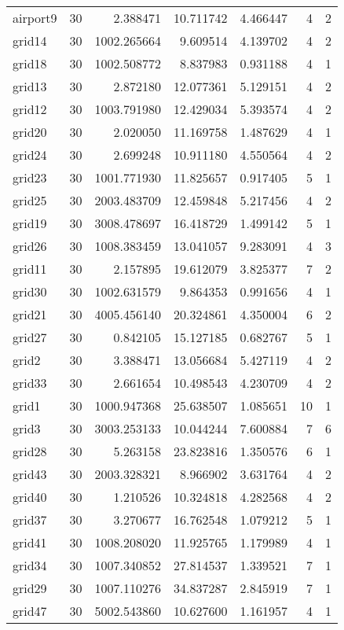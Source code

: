 \begin{longtable}{|l|r|r|r|r|r|r|}
airport9 & 30 & 2.388471 & 10.711742 & 4.466447 & 4 & 2 \\
grid14 & 30 & 1002.265664 & 9.609514 & 4.139702 & 4 & 2 \\
grid18 & 30 & 1002.508772 & 8.837983 & 0.931188 & 4 & 1 \\
grid13 & 30 & 2.872180 & 12.077361 & 5.129151 & 4 & 2 \\
grid12 & 30 & 1003.791980 & 12.429034 & 5.393574 & 4 & 2 \\
grid20 & 30 & 2.020050 & 11.169758 & 1.487629 & 4 & 1 \\
grid24 & 30 & 2.699248 & 10.911180 & 4.550564 & 4 & 2 \\
grid23 & 30 & 1001.771930 & 11.825657 & 0.917405 & 5 & 1 \\
grid25 & 30 & 2003.483709 & 12.459848 & 5.217456 & 4 & 2 \\
grid19 & 30 & 3008.478697 & 16.418729 & 1.499142 & 5 & 1 \\
grid26 & 30 & 1008.383459 & 13.041057 & 9.283091 & 4 & 3 \\
grid11 & 30 & 2.157895 & 19.612079 & 3.825377 & 7 & 2 \\
grid30 & 30 & 1002.631579 & 9.864353 & 0.991656 & 4 & 1 \\
grid21 & 30 & 4005.456140 & 20.324861 & 4.350004 & 6 & 2 \\
grid27 & 30 & 0.842105 & 15.127185 & 0.682767 & 5 & 1 \\
grid2 & 30 & 3.388471 & 13.056684 & 5.427119 & 4 & 2 \\
grid33 & 30 & 2.661654 & 10.498543 & 4.230709 & 4 & 2 \\
grid1 & 30 & 1000.947368 & 25.638507 & 1.085651 & 10 & 1 \\
grid3 & 30 & 3003.253133 & 10.044244 & 7.600884 & 7 & 6 \\
grid28 & 30 & 5.263158 & 23.823816 & 1.350576 & 6 & 1 \\
grid43 & 30 & 2003.328321 & 8.966902 & 3.631764 & 4 & 2 \\
grid40 & 30 & 1.210526 & 10.324818 & 4.282568 & 4 & 2 \\
grid37 & 30 & 3.270677 & 16.762548 & 1.079212 & 5 & 1 \\
grid41 & 30 & 1008.208020 & 11.925765 & 1.179989 & 4 & 1 \\
grid34 & 30 & 1007.340852 & 27.814537 & 1.339521 & 7 & 1 \\
grid29 & 30 & 1007.110276 & 34.837287 & 2.845919 & 7 & 1 \\
grid47 & 30 & 5002.543860 & 10.627600 & 1.161957 & 4 & 1 \\

\end{longtable}
